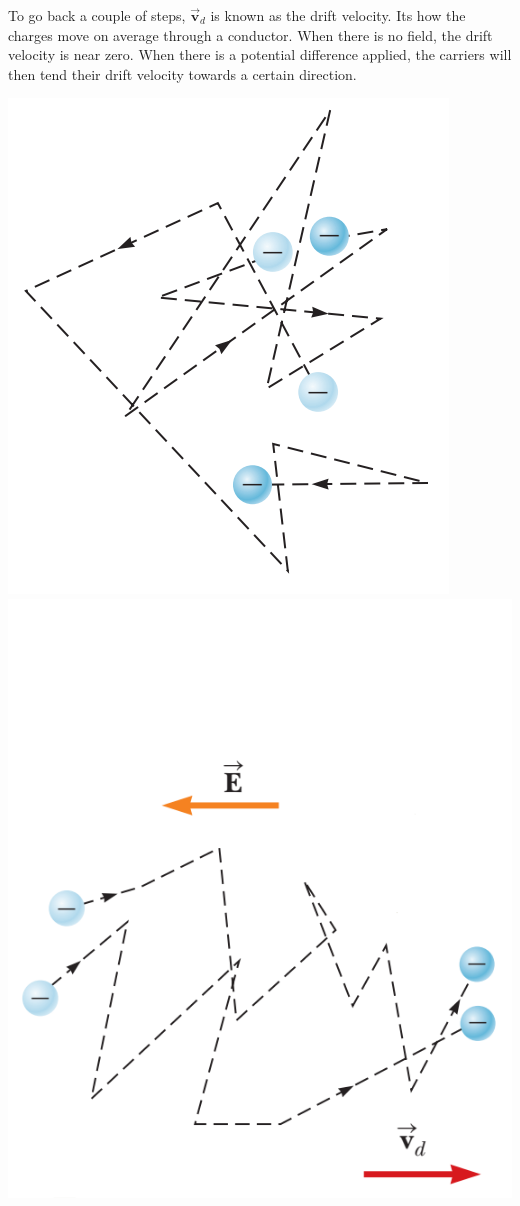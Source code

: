 \documentclass[12pt, titlepage, oneside]{article}
\let\oldvec\vec
\renewcommand{\vec}[1]{\oldvec{\bm{#1}}}
\begin{document}
To go back a couple of steps, $\vec{v}_d$ is known as the drift velocity. Its how the charges move on average through a conductor. When there is no field, the drift velocity is near zero. When there is a potential difference applied, the carriers will then tend their drift velocity towards a certain direction.

\newpage	
\begin{center}
		\includegraphics[scale=.7]{2.png} \hspace{2cm}
		\includegraphics[scale=.7]{3.png}
\end{center}
\end{document}
